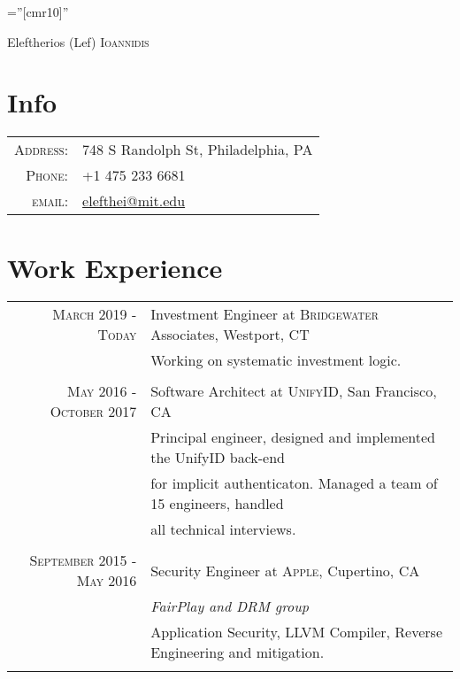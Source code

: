 \documentclass[lettersize,11pt]{article}
\begin{document}
\pagestyle{empty} %
\font\fb=''[cmr10]'' %

\par{\centering
		{\Huge Eleftherios (Lef) \textsc{Ioannidis}
	}
	\bigskip\par}

\section{Info}

\begin{tabular}{rl}
    \textsc{Address:}   & 748 S Randolph St, Philadelphia, PA \\
    \textsc{Phone:}     & +1 475 233 6681\\
    \textsc{email:}     & \href{mailto:elefthei@mit.edu}{elefthei@mit.edu}
\end{tabular}

\section{Work Experience}
\begin{tabular}{rl}
\textsc{March 2019 - Today} & Investment Engineer at \textsc{Bridgewater} Associates, Westport, CT\\
&\footnotesize{Working on systematic investment logic.}\\\multicolumn{2}{c}{} \\

\textsc{May 2016 - October 2017} & Software Architect at \textsc{UnifyID}, San Francisco, CA\\
&\footnotesize{Principal engineer, designed and implemented the UnifyID back-end}\\
&\footnotesize{for implicit authenticaton. Managed a team of 15 engineers, handled}\\
&\footnotesize{all technical interviews.}\\\multicolumn{2}{c}{} \\

\textsc{September 2015 - May 2016} & Security Engineer at \textsc{Apple}, Cupertino, CA \\&\emph{FairPlay and DRM group}\\
&\footnotesize{Application Security, LLVM Compiler, Reverse Engineering and mitigation.} \\\multicolumn{2}{c}{} \\
\end{tabular}
\end{document}
